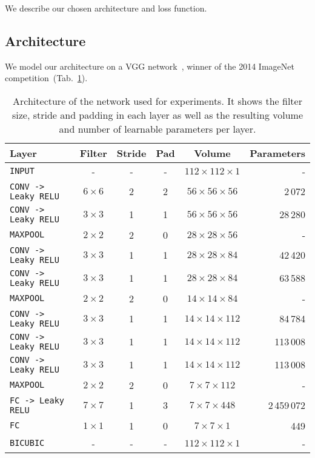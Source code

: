 We describe our chosen architecture and loss function.

\subsection{Architecture}
We model our architecture on a VGG network~\cite{Simonyan2014}, winner of the 2014 ImageNet competition~(Tab.~\ref{tab:convNetArchitecture}).
\begin{table}[h]
	\centering
	\begin{tabular}{lccccr}
	\hline
	\textbf{Layer} & \textbf{Filter} & \textbf{Stride} &\textbf{Pad} & \textbf{Volume} & \textbf{Parameters} \\
	\hline
	\texttt{INPUT}	& -	& - & - & $112 \times 112 \times 1$ & -\\
	\texttt{CONV -> Leaky RELU} & $6 \times 6$ & 2 & 2 & $56 \times 56 \times 56$ & 2\,072\\
	\texttt{CONV -> Leaky RELU} & $3 \times 3$ & 1 & 1 & $56 \times 56 \times 56$ & 28\,280\\
	\texttt{MAXPOOL} & $2 \times 2$ & 2 & 0 & $28 \times 28 \times 56$ & -\\
	\texttt{CONV -> Leaky RELU} & $3 \times 3$ & 1 & 1 & $28 \times 28 \times 84$ & 42\,420\\
	\texttt{CONV -> Leaky RELU} & $3 \times 3$ & 1 & 1 & $28 \times 28 \times 84$ & 63\,588\\
	\texttt{MAXPOOL} & $2 \times 2$ & 2 & 0 & $14 \times 14 \times 84$ & -\\
	\texttt{CONV -> Leaky RELU} & $3 \times 3$ & 1 & 1 & $14 \times 14 \times 112$ & 84\,784\\
	\texttt{CONV -> Leaky RELU} & $3 \times 3$ & 1 & 1 & $14 \times 14 \times 112$ & 113\,008\\
	\texttt{CONV -> Leaky RELU} & $3 \times 3$ & 1 & 1 & $14 \times 14 \times 112$ & 113\,008\\
	\texttt{MAXPOOL} & $2 \times 2$ & 2 & 0 & $7 \times 7 \times 112$ & -\\
	\texttt{FC -> Leaky RELU} & $7 \times 7$ & 1 & 3 & $7 \times 7 \times 448$ & 2\,459\,072\\
	\texttt{FC} & $1 \times 1$ & 1 & 0 & $7 \times 7 \times 1$ & 449 \\
	\texttt{BICUBIC} & - & - & - & $112 \times 112 \times 1$ & -\\
	\hline
	\end{tabular}
	\caption[Selected convolutional network architecture]{Architecture of the network used for experiments. It shows the filter size, stride and padding in each layer as well as the resulting volume and number of learnable parameters per layer.}
	\label{tab:convNetArchitecture}
\end{table}


